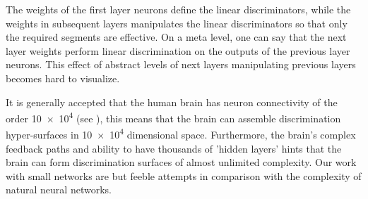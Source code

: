 The weights of the first layer neurons define the linear discriminators, while the weights in subsequent layers manipulates the linear discriminators so that only the required segments are effective.  On a meta level, one can say that the next layer weights perform linear discrimination on the outputs of the previous layer neurons.  This effect of abstract levels of next layers manipulating previous layers becomes hard to visualize.

It is generally accepted that the human brain has neuron connectivity of the order \num{10e4} (see \cite{WikiPediaNeuron2019}), this means that the brain can assemble discrimination hyper-surfaces in \num{10e4}  dimensional space.  Furthermore, the brain's complex feedback paths and ability to have thousands of 'hidden layers' hints that the brain can form discrimination surfaces of almost unlimited complexity.  Our work with small networks are but feeble attempts in comparison with the complexity of natural neural networks.  
